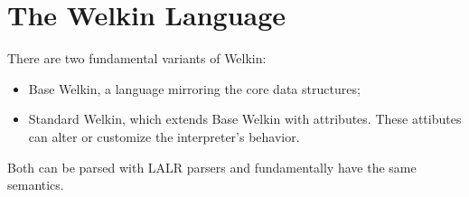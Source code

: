\section{The Welkin Language}

There are two fundamental variants of Welkin:
\begin{itemize}
	\item Base Welkin, a language mirroring the core data structures;
	\item Standard Welkin, which extends Base Welkin with attributes. These attibutes can alter or customize the interpreter's behavior.
\end{itemize}
Both can be parsed with LALR parsers and fundamentally have the same semantics.

